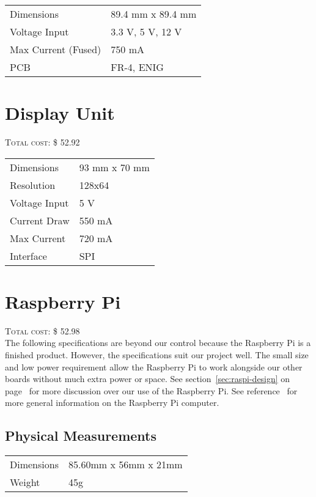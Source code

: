 \begin{tabular}{p{} p{}}
\hline
Dimensions & 89.4 mm x 89.4 mm \\
Voltage Input & 3.3 V, 5 V, 12 V \\
Max Current (Fused) & 750 mA \\
PCB & FR-4, ENIG \\
\hline
\end{tabular}

\pagebreak

\section{Display Unit}
\textsc{Total cost: \$ 52.92} \\

\nopagebreak

\begin{tabular}{p{} p{}}
\hline
Dimensions & 93 mm x 70 mm \\
Resolution  & 128x64 \\
Voltage Input & 5 V \\
Current Draw & 550 mA \\
Max Current & 720 mA \\
Interface & SPI \\
\hline
\end{tabular}

\section{Raspberry Pi}
\textsc{Total cost: \$ 52.98} \\

The following specifications are beyond our control because the Raspberry Pi
is a finished product. However, the specifications suit our project well. The
small size and low power requirement allow the Raspberry Pi to work alongside
our other boards without much extra power or space. See
section~\ref{sec:raspi-design} on page~\pageref{sec:raspi-design} for more
discussion over our use of the Raspberry Pi. See reference~\cite{raspifaq} for
more general information on the Raspberry Pi computer.

\subsection{Physical Measurements}

\begin{tabular}{p{} p{}}
\hline
Dimensions & 85.60mm x 56mm x 21mm \\
Weight & 45g \\ \hline
\end{tabular}

